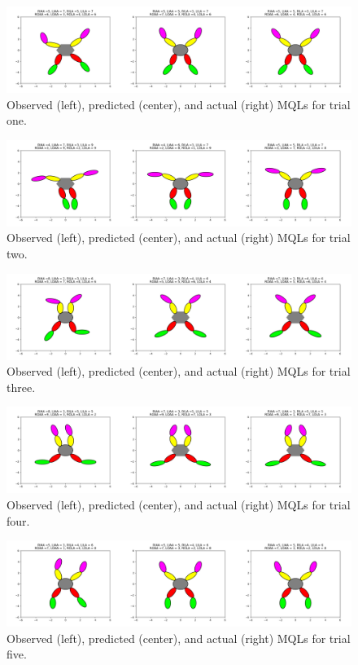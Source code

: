 \documentclass{article}
\begin{document}
\begin{figure}[!ht]
	\centering
	\includegraphics[width=180mm]{figs/mql_trial1_all.png}
	\caption{Observed (left), predicted (center), and actual (right) MQLs for trial one.}
\end{figure}
\begin{figure}[!ht]
	\centering
	\includegraphics[width=180mm]{figs/mql_trial2_all.png}
	\caption{Observed (left), predicted (center), and actual (right) MQLs for trial two.}
\end{figure}
\begin{figure}[!ht]
	\centering
	\includegraphics[width=180mm]{figs/mql_trial3_all.png}
	\caption{Observed (left), predicted (center), and actual (right) MQLs for trial three.}
\end{figure}
\begin{figure}[!ht]
	\centering
	\includegraphics[width=180mm]{figs/mql_trial4_all.png}
	\caption{Observed (left), predicted (center), and actual (right) MQLs for trial four.}
\end{figure}
\begin{figure}[!ht]
	\centering
	\includegraphics[width=180mm]{figs/mql_trial5_all.png}
	\caption{Observed (left), predicted (center), and actual (right) MQLs for trial five.}
\end{figure}
\end{document}
